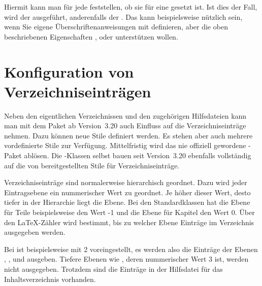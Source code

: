 \begin{Declaration}
\end{Declaration}
Hiermit kann man für jede  feststellen, ob sie für eine
 gesetzt ist. Ist dies der Fall, wird der
 ausgeführt, anderenfalls der . Das kann
beispielsweise nützlich sein, wenn Sie eigene Überschriftenanweisungen mit
 definieren, aber die oben beschriebenen
Eigenschaften ,  oder 
unterstützen wollen.
%
\EndIndexGroup


\section{Konfiguration von Verzeichniseinträgen}
\BeginIndexGroup
{}

Neben den eigentlichen
Verzeichnissen und den zugehörigen Hilfsdateien kann man mit dem Paket
 ab Version~3.20 auch Einfluss auf die Verzeichniseinträge
nehmen. Dazu können neue Stile definiert werden. Es stehen aber auch mehrere
vordefinierte Stile zur Verfügung. Mittelfristig wird  das
nie offiziell gewordene \KOMAScript-Paket  ablösen. Die
\KOMAScript-Klassen selbst bauen seit Version~3.20 ebenfalls vollständig auf
die von  bereitgestellten Stile für Verzeichniseinträge.

\begin{Declaration}
\end{Declaration}
Verzeichniseinträge sind normalerweise hierarchisch geordnet. Dazu wird jeder
Eintragsebene ein nummerischer Wert zu geordnet. Je höher dieser Wert, desto
tiefer in der Hierarchie liegt die Ebene. Bei den Standardklassen hat die
Ebene für Teile beispielsweise den Wert -1 und die Ebene für Kapitel den Wert
0. Über den \LaTeX-Zähler  wird bestimmt, bis zu welcher
Ebene Einträge im Verzeichnis ausgegeben werden. 

Bei  ist  beispielsweise mit 2 voreingestellt,
es werden also die Einträge der Ebenen , ,
 und  ausgeben. Tiefere Ebenen wie
, deren nummerischer Wert 3 ist, werden nicht
ausgegeben. Trotzdem sind die Einträge in der Hilfsdatei für das
Inhaltsverzeichnis vorhanden.

